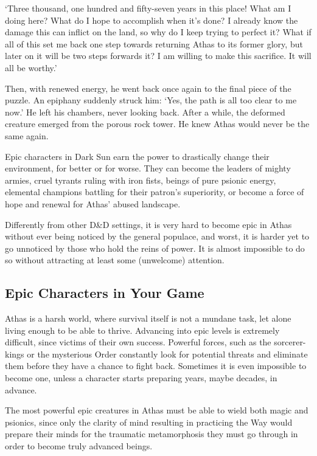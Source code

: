{
`Three thousand, one hundred and fifty-seven years in this place! What am I doing here? What do I hope to accomplish when it's done? I already know the damage this can inflict on the land, so why do I keep trying to perfect it? What if all of this set me back one step towards returning Athas to its former glory, but later on it will be two steps forwards it? I am willing to make this sacrifice. It will all be worthy.'

Then, with renewed energy, he went back once again to the final piece of the puzzle. An epiphany suddenly struck him: `Yes, the path is all too clear to me now.' He left his chambers, never looking back. After a while, the deformed creature emerged from the porous rock tower. He knew Athas would never be the same again.
}{}

Epic characters in {\tableheader Dark Sun} earn the power to drastically change their environment, for better or for worse. They can become the leaders of mighty armies, cruel tyrants ruling with iron fists, beings of pure psionic
energy, elemental champions battling for their patron's superiority, or become a force of hope and renewal for Athas' abused landscape.

Differently from other {\tableheader D\&D} settings, it is very hard to become epic in Athas without ever being noticed by the general populace, and worst, it is harder yet to go unnoticed by those who hold the reins of power. It is almost impossible to do so without attracting at least some (unwelcome) attention.

\subsection{Epic Characters in Your Game}
Athas is a harsh world, where survival itself is not a mundane task, let alone living enough to be able to thrive. Advancing into epic levels is extremely difficult, since victims of their own success. Powerful forces, such as the sorcerer-kings or the mysterious Order constantly look for potential threats and eliminate them before they have a
chance to fight back. Sometimes it is even impossible to become one, unless a character starts preparing years, maybe decades, in advance.

The most powerful epic creatures in Athas must be able to wield both magic and psionics, since only the clarity of mind resulting in practicing the Way would prepare their minds for the traumatic metamorphosis they must go through in order to become truly advanced beings.




\clearpage

\clearpage

\clearpage

